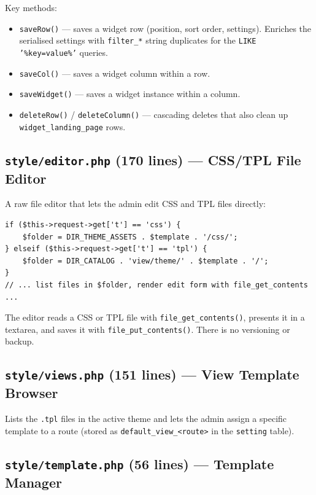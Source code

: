 \documentclass[11pt,a4paper]{article}
\begin{document}
Key methods:
\begin{itemize}[leftmargin=1.6em,itemsep=2pt]
  \item \texttt{saveRow()} --- saves a widget row (position, sort order,
        settings). Enriches the serialised settings with
        \texttt{filter\_*} string duplicates for the
        \texttt{LIKE '\%key=value\%'} queries.
  \item \texttt{saveCol()} --- saves a widget column within a row.
  \item \texttt{saveWidget()} --- saves a widget instance within a
        column.
  \item \texttt{deleteRow()} / \texttt{deleteColumn()} --- cascading
        deletes that also clean up \texttt{widget\_landing\_page} rows.
\end{itemize}

\subsection{\texttt{style/editor.php} (170 lines) --- CSS/TPL File Editor}

A raw file editor that lets the admin edit CSS and TPL files directly:

\begin{lstlisting}[caption={\texttt{style/editor.php} --- the file type switch.},label={lst:editor}]
if ($this->request->get['t'] == 'css') {
    $folder = DIR_THEME_ASSETS . $template . '/css/';
} elseif ($this->request->get['t'] == 'tpl') {
    $folder = DIR_CATALOG . 'view/theme/' . $template . '/';
}
// ... list files in $folder, render edit form with file_get_contents ...
\end{lstlisting}

The editor reads a CSS or TPL file with \texttt{file\_get\_contents()},
presents it in a textarea, and saves it with
\texttt{file\_put\_contents()}. There is no versioning or backup.

\subsection{\texttt{style/views.php} (151 lines) --- View Template Browser}

Lists the \texttt{.tpl} files in the active theme and lets the admin
assign a specific template to a route (stored as
\texttt{default\_view\_<route>} in the \texttt{setting} table).

\subsection{\texttt{style/template.php} (56 lines) --- Template Manager}
\end{document}
